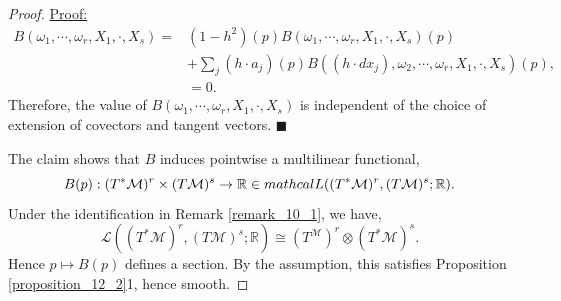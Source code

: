 \documentclass[8pt]{article}
\newenvironment{claimproof}[1]{\par\noindent\underline{Proof:}\space#1}{\hfill $\blacksquare$}
\newcommand{\defeq}{\vcentcolon=}
\newcommand{\R}[0]{\mathbb{R}}
\newcommand{\M}[0]{\mathcal{M}}
\newcommand{\cinf}[0]{\mathcal{C}^\infty}
\begin{document}
\begin{proof}
\begin{claimproof}
\begin{align*}
    B(\omega_1,\cdots,\omega_r,X_1,\cdot,X_s) =&  (1-h^2)(p)B(\omega_1,\cdots,\omega_r,X_1,\cdot,X_s)(p)\\
    &+ \sum_{j}(h\cdot a_j)(p)B((h\cdot dx_j),\omega_2,\cdots,\omega_r,X_1,\cdot,X_s)(p),\\
    & = 0.
  \end{align*}
  Therefore, the value of $B(\omega_1,\cdots,\omega_r,X_1,\cdot,X_s)$ is independent of the choice of extension of covectors and tangent vectors.
\end{claimproof}
\par The claim shows that $B$ induces pointwise a multilinear functional,
\begin{equation*}
B(p):(T^*\M)^r\times (T\M)^s\to\R\in\\mathcal{L}((T^*\M)^r,(T\M)^s;\R).
\end{equation*} 
Under the identification in Remark \ref{remark_10_1}, we have,
\begin{equation*}
  \mathcal{L}((T^*\M)^r,(T\M)^s;\R)\cong (T^\M)^r\otimes (T^*\M)^s.
\end{equation*}
Hence $p\mapsto B(p)$ defines a section. By the assumption, this satisfies Proposition \ref{proposition_12_2}1, hence smooth.
\end{proof}
\end{document}
